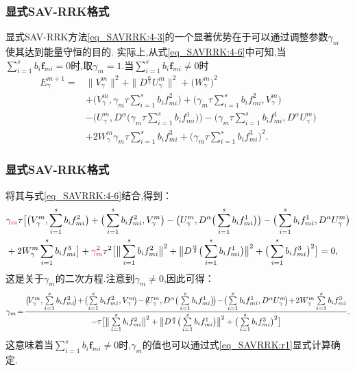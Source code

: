 \documentclass[aspectratio=169]{beamer}
\numberwithin{theorem}{section} %
\numberwithin{equation}{section}%
\numberwithin{figure}{section}%
\numberwithin{table}{section}%
\begin{document}
\begin{frame}\frametitle{显式SAV-RRK格式}

	
显式SAV-RRK方法\eqref{eq_SAVRRK:4-3}的一个显著优势在于可以通过调整参数$\gamma_m$ 使其达到能量守恒的目的.
实际上,从式\eqref{eq_SAVRRK:4-6}中可知,当$\sum\limits_{i=1}^s b_i \bm{f}_{m i}=0$时,取$\gamma_m=1$.当$\sum\limits_{i=1}^s b_i \bm{f}_{m i}\neq 0$时
	\begin{align}
	E_{\gamma}^{m+1}  = & \|V_{\gamma}^{m}\|^2+\|D^\frac{\alpha}{2} U_{\gamma}^{m}\|^2+\big(W_{\gamma}^{m}\big)^2 \nonumber\\
	& + \big(V_{\gamma}^{m},\gamma_m\tau\sum\limits_{i=1}^{s}b_if_{mi}^2\big)+\big(\gamma_m\tau\sum\limits_{i=1}^{s}b_if_{mi}^2,V_{\gamma}^{m}\big)\nonumber\\
	&-\big(U_{\gamma}^{m}, D^{\alpha}\big(\gamma_m\tau\sum\limits_{i=1}^{s}b_if_{mi}^1\big)\big)-\big(\gamma_m\tau\sum\limits_{i=1}^{s}b_if_{mi}^1, D^{\alpha} U_{\gamma}^{m}\big)\nonumber\\
	&+2W_{\gamma}^{m}\gamma_m\tau\sum\limits_{i=1}^{s}b_if_{mi}^3+\big(\gamma_m\tau\sum\limits_{i=1}^{s}b_if_{mi}^3\big)^2.\label{eq_SAVRRK:49}
	\end{align}
		
\end{frame}

\begin{frame}\frametitle{显式SAV-RRK格式}
\noindent 将其与式\eqref{eq_SAVRRK:4-6}结合,得到：
	\begin{align*}
	&{\color{purple}\gamma_m}\tau\big[\big(V_{\gamma}^{m},\sum\limits_{i=1}^{s}b_if_{mi}^2\big)+\big(\sum\limits_{i=1}^{s}b_if_{mi}^2,V_{\gamma}^{m}\big)-\big(U_{\gamma}^{m},D^{\alpha}\big(\sum\limits_{i=1}^{s}b_if_{mi}^1\big)\big)-\big(\sum\limits_{i=1}^{s}b_if_{mi}^1, D^{\alpha} U_{\gamma}^{m}\big)\\
	&+2W_{\gamma}^{m}\sum\limits_{i=1}^{s}b_if_{mi}^3\big] +{\color{purple}\gamma_m^2}\tau^2\big[\big\|\sum\limits_{i=1}^{s}b_if_{mi}^2\big\|^2+ \big\|D^\frac{\alpha}{2}\big(\sum\limits_{i=1}^{s}b_if_{mi}^1\big)\big\|^2+\big(\sum\limits_{i=1}^{s}b_if_{mi}^3\big)^2\big]=0,
	\end{align*}
	这是关于$\gamma_m$的二次方程.注意到$\gamma_m\neq 0$,因此可得：
	\begin{equation}\label{eq_SAVRRK:r1}\small
	\gamma_m \!=\! \frac{\big(\!V_{\gamma}^{m},\sum\limits_{i=1}^{s}b_if_{mi}^2\!\big)\!+\!\big(\!\sum\limits_{i=1}^{s}b_if_{mi}^2,V_{\gamma}^{m}\!\big)\!-\!\big(\!U_{\gamma}^{m},D^{\alpha}\big(\sum\limits_{i=1}^{s}b_if_{mi}^1\big)\!\big)\!-\!\big(\!\sum\limits_{i=1}^{s}b_if_{mi}^1, D^{\alpha} U_{\gamma}^{m}\!\big)\!+\!2W_{\gamma}^{m}\sum\limits_{i=1}^{s}b_if_{mi}^3}{-\tau\big[\big\|\sum\limits_{i=1}^{s}b_if_{mi}^2\big\|^2+\big\|D^\frac{\alpha}{2}\big(\sum\limits_{i=1}^{s}b_if_{mi}^1\big)\big\|^2+\big(\sum\limits_{i=1}^{s}b_if_{mi}^3\big)^2\big]} .
	\end{equation}
	这意味着当$\sum\limits_{i=1}^s b_i \bm{f}_{m i}\neq 0$时,$\gamma_m$的值也可以通过式\eqref{eq_SAVRRK:r1}显式计算确定.

\end{frame}
\end{document}
